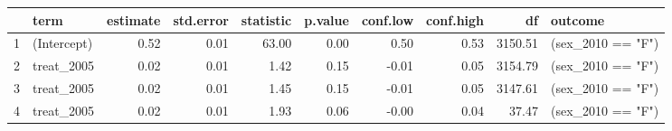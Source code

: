 \begin{table}[ht]
\centering
\begin{tabular}{rlrrrrrrrl}
  \hline
 & term & estimate & std.error & statistic & p.value & conf.low & conf.high & df & outcome \\ 
  \hline
1 & (Intercept) & 0.52 & 0.01 & 63.00 & 0.00 & 0.50 & 0.53 & 3150.51 & (sex\_2010 == "F") \\ 
  2 & treat\_2005 & 0.02 & 0.01 & 1.42 & 0.15 & -0.01 & 0.05 & 3154.79 & (sex\_2010 == "F") \\ 
  3 & treat\_2005 & 0.02 & 0.01 & 1.45 & 0.15 & -0.01 & 0.05 & 3147.61 & (sex\_2010 == "F") \\ 
  4 & treat\_2005 & 0.02 & 0.01 & 1.93 & 0.06 & -0.00 & 0.04 & 37.47 & (sex\_2010 == "F") \\ 
   \hline
\end{tabular}
\end{table}

